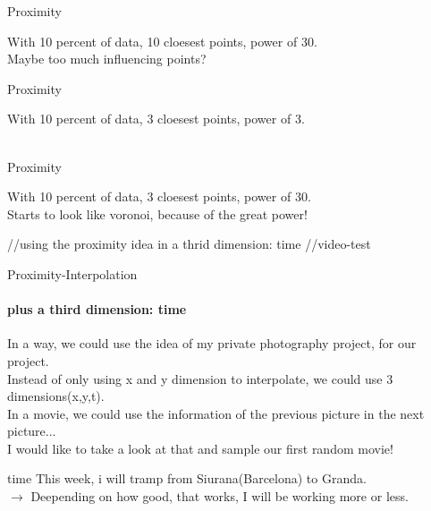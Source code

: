 \begin{frame}{Proximity}
\begin{center}
\end{center}
With 10 percent of data, 10 cloesest points, power of 30.\\
Maybe too much influencing points?\\
\end{frame}

\begin{frame}{Proximity}
\begin{center}
\end{center}
With 10 percent of data, 3 cloesest points, power of 3.\\
\\
\end{frame}

\begin{frame}{Proximity}
\begin{center}
\end{center}
With 10 percent of data, 3 cloesest points, power of 30.\\
Starts to look like voronoi, because of the great power!\\
\end{frame}

//using the proximity idea in a thrid dimension: time
//video-test

\begin{frame}{Proximity-Interpolation}
\framesubtitle{plus a third dimension: time}
In a way, we could use the idea of my private photography project, for our project.\\
Instead of only using x and y dimension to interpolate, we could use 3 dimensions(x,y,t).\\
In a movie, we could use the information of the previous picture in the next picture...\\
I would like to take a look at that and sample our first random movie!\\
\end{frame}

\begin{frame}{time}
This week, i will tramp from Siurana(Barcelona) to Granda.\\
\(\rightarrow\) Deepending on how good, that works, I will  be working
more or less.
\end{frame}
